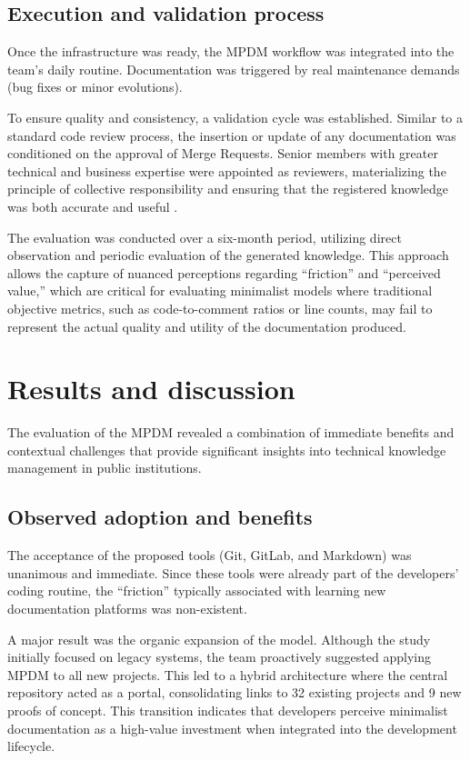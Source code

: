 \documentclass{ieeeaccess}
\begin{document}
\subsection{Execution and validation process}
Once the infrastructure was ready, the MPDM workflow was integrated into the team's daily routine. Documentation was triggered by real maintenance demands (bug fixes or minor evolutions).

To ensure quality and consistency, a validation cycle was established. Similar to a standard code review process, the insertion or update of any documentation was conditioned on the approval of Merge Requests. Senior members with greater technical and business expertise were appointed as reviewers, materializing the principle of collective responsibility and ensuring that the registered knowledge was both accurate and useful \cite{antoniol}.

The evaluation was conducted over a six-month period, utilizing direct observation and periodic evaluation of the generated knowledge. This approach allows the capture of nuanced perceptions regarding ``friction'' and ``perceived value,'' which are critical for evaluating minimalist models where traditional objective metrics, such as code-to-comment ratios or line counts, may fail to represent the actual quality and utility of the documentation produced.

\section{Results and discussion}
The evaluation of the MPDM revealed a combination of immediate benefits and contextual challenges that provide significant insights into technical knowledge management in public institutions.

\subsection{Observed adoption and benefits}
The acceptance of the proposed tools (Git, GitLab, and Markdown) was unanimous and immediate. Since these tools were already part of the developers' coding routine, the ``friction'' typically associated with learning new documentation platforms was non-existent.

A major result was the organic expansion of the model. Although the study initially focused on legacy systems, the team proactively suggested applying MPDM to all new projects. This led to a hybrid architecture where the central repository acted as a portal, consolidating links to 32 existing projects and 9 new proofs of concept. This transition indicates that developers perceive minimalist documentation as a high-value investment when integrated into the development lifecycle.
\end{document}
